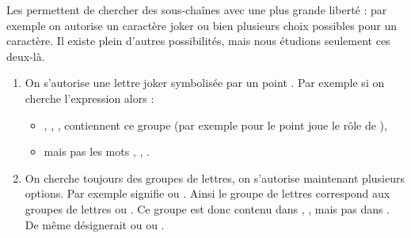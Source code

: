 \documentclass[11pt,class=report,crop=false]{standalone}
\begin{document}


\begin{cours}


Les  permettent de chercher des sous-chaînes avec une plus grande liberté : par exemple on autorise un caractère joker ou bien plusieurs choix possibles pour un caractère.
Il existe plein d'autres possibilités, mais nous étudions seulement ces deux-là.

\begin{enumerate}
  \item On s'autorise une lettre joker symbolisée par un point \og {} \fg{}. Par exemple si on cherche l'expression \og {} \fg{} alors :

\begin{itemize}
  \item {}, , ,  contiennent ce groupe (par exemple pour  le point joue le rôle de ),
  \item  mais pas les mots , , . 
\end{itemize}

  \item On cherche toujours des groupes de lettres, on s'autorise maintenant plusieurs options. Par exemple \og \mot{[CT]} \fg{} signifie \og {} ou  \fg{}. Ainsi le groupe de lettres \og {} \fg{} correspond aux groupes de lettres \og {} \fg{} ou \og {} \fg{}. Ce groupe est donc contenu dans , ,  mais pas dans . De même \og \mot{[ABC]} \fg{} désignerait \og {} ou   ou   \fg{}.

\end{enumerate}


\end{cours}
\end{document}
